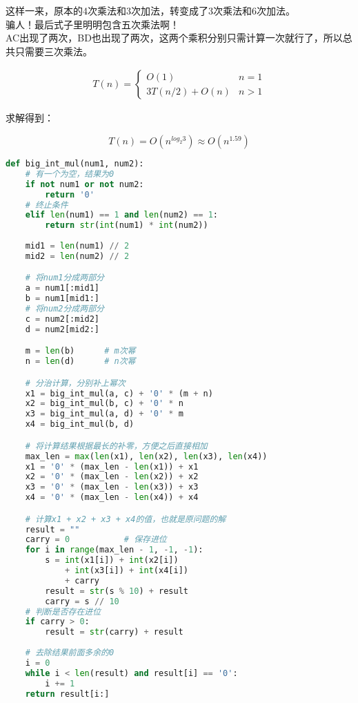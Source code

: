 这样一来，原本的4次乘法和3次加法，转变成了3次乘法和6次加法。\\

骗人！最后式子里明明包含五次乘法啊！\\

AC出现了两次，BD也出现了两次，这两个乘积分别只需计算一次就行了，所以总共只需要三次乘法。

\vspace{-0.5cm}

\begin{align*}
	T(n) = \begin{cases}
		O(1)           & n = 1 \\
		3T(n/2) + O(n) & n > 1
	\end{cases}
\end{align*}

求解得到：

\vspace{-0.5cm}

$$
	T(n) = O(n^{log_2{3}}) \approx O(n^{1.59})
$$

\vspace{0.5cm}


\begin{lstlisting}[language=Python]
def big_int_mul(num1, num2):
    # 有一个为空，结果为0
    if not num1 or not num2:
        return '0'
    # 终止条件
    elif len(num1) == 1 and len(num2) == 1:
        return str(int(num1) * int(num2))
    
    mid1 = len(num1) // 2
    mid2 = len(num2) // 2

    # 将num1分成两部分
    a = num1[:mid1]
    b = num1[mid1:]
    # 将num2分成两部分
    c = num2[:mid2]
    d = num2[mid2:]

    m = len(b)      # m次幂
    n = len(d)      # n次幂

    # 分治计算，分别补上幂次
    x1 = big_int_mul(a, c) + '0' * (m + n)
    x2 = big_int_mul(b, c) + '0' * n
    x3 = big_int_mul(a, d) + '0' * m
    x4 = big_int_mul(b, d)

    # 将计算结果根据最长的补零，方便之后直接相加
    max_len = max(len(x1), len(x2), len(x3), len(x4))
    x1 = '0' * (max_len - len(x1)) + x1
    x2 = '0' * (max_len - len(x2)) + x2
    x3 = '0' * (max_len - len(x3)) + x3
    x4 = '0' * (max_len - len(x4)) + x4

    # 计算x1 + x2 + x3 + x4的值，也就是原问题的解
    result = ""
    carry = 0           # 保存进位
    for i in range(max_len - 1, -1, -1):
        s = int(x1[i]) + int(x2[i]) 
            + int(x3[i]) + int(x4[i])
            + carry
        result = str(s % 10) + result
        carry = s // 10
    # 判断是否存在进位
    if carry > 0:
        result = str(carry) + result
    
    # 去除结果前面多余的0
    i = 0
    while i < len(result) and result[i] == '0':
        i += 1
    return result[i:]
\end{lstlisting}

